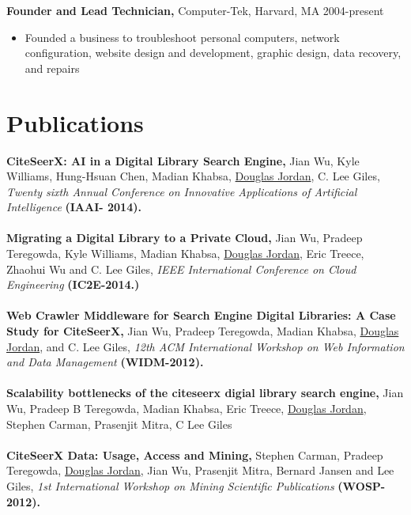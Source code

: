 \documentclass[margin]{res}
\begin{document}
\begin{resume}
{\bf Founder and Lead Technician,} Computer-Tek, Harvard, MA \hfill 2004-present
\begin{itemize} \itemsep -2pt
\item Founded a business to troubleshoot personal computers, network configuration, website design and development, graphic design, data recovery, and repairs
\end{itemize}

\section{Publications}
{\bf CiteSeerX: AI in a Digital Library Search Engine,} Jian Wu, Kyle Williams, Hung-Hsuan Chen, Madian Khabsa, \underline{Douglas Jordan}, C. Lee Giles, \textit{Twenty sixth Annual Conference on Innovative Applications of Artificial Intelligence} {\bf (IAAI-	2014).} \\ \\
{\bf Migrating a Digital Library to a Private Cloud,} Jian Wu, Pradeep Teregowda, Kyle Williams, Madian Khabsa, \underline{Douglas Jordan}, Eric Treece, Zhaohui Wu and C. Lee Giles, \emph{IEEE International Conference on Cloud Engineering} {\bf (IC2E-2014.)} \\ \\
{\bf Web Crawler Middleware for Search Engine Digital Libraries: A Case Study for CiteSeerX,} Jian Wu, Pradeep Teregowda, Madian Khabsa, \underline{Douglas Jordan}, and C. Lee Giles, \emph{12th ACM International Workshop on Web Information and Data Management} {\bf (WIDM-2012).}  \\ \\
{\bf Scalability bottlenecks of the citeseerx digial library search engine,} Jian Wu, Pradeep B Teregowda, Madian Khabsa, Eric Treece, \underline{Douglas Jordan}, Stephen Carman, Prasenjit Mitra, C Lee Giles \\ \\
{\bf CiteSeerX Data: Usage, Access and Mining,} Stephen Carman, Pradeep Teregowda, \underline{Douglas Jordan}, Jian Wu, Prasenjit Mitra, Bernard Jansen and Lee Giles, \emph{1st International Workshop on Mining Scientific Publications} {\bf (WOSP-2012).}


\end{resume}
\end{document}
